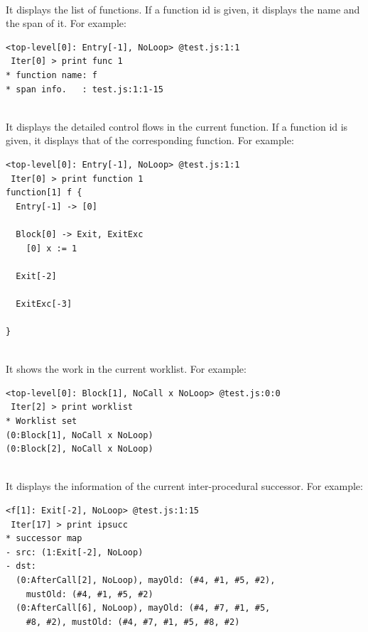 \medskip\noindent
{}\\[.2em]
It displays the list of functions.
If a function id is given, it displays the name and the span of it.
For example:
{\small
\begin{verbatim}
<top-level[0]: Entry[-1], NoLoop> @test.js:1:1
 Iter[0] > print func 1
* function name: f
* span info.   : test.js:1:1-15
\end{verbatim}
}

\medskip\noindent
{}\\[.2em]
It displays the detailed control flows in the current function.
If a function id is given, it displays that of the corresponding function.
For example:
{\small
\begin{verbatim}
<top-level[0]: Entry[-1], NoLoop> @test.js:1:1
 Iter[0] > print function 1
function[1] f {
  Entry[-1] -> [0]

  Block[0] -> Exit, ExitExc
    [0] x := 1

  Exit[-2]

  ExitExc[-3]

}
\end{verbatim}
}

\medskip\noindent
{}\\[.2em]
It shows the work in the current worklist.  For example:
{\small
\begin{verbatim}
<top-level[0]: Block[1], NoCall x NoLoop> @test.js:0:0
 Iter[2] > print worklist
* Worklist set
(0:Block[1], NoCall x NoLoop)
(0:Block[2], NoCall x NoLoop)
\end{verbatim}
}

\medskip\noindent
{}\\[.2em]
It displays the information of the current inter-procedural successor.
For example:
{\small
\begin{verbatim}
<f[1]: Exit[-2], NoLoop> @test.js:1:15
 Iter[17] > print ipsucc
* successor map
- src: (1:Exit[-2], NoLoop)
- dst:
  (0:AfterCall[2], NoLoop), mayOld: (#4, #1, #5, #2),
    mustOld: (#4, #1, #5, #2)
  (0:AfterCall[6], NoLoop), mayOld: (#4, #7, #1, #5,
    #8, #2), mustOld: (#4, #7, #1, #5, #8, #2)
\end{verbatim}
}

